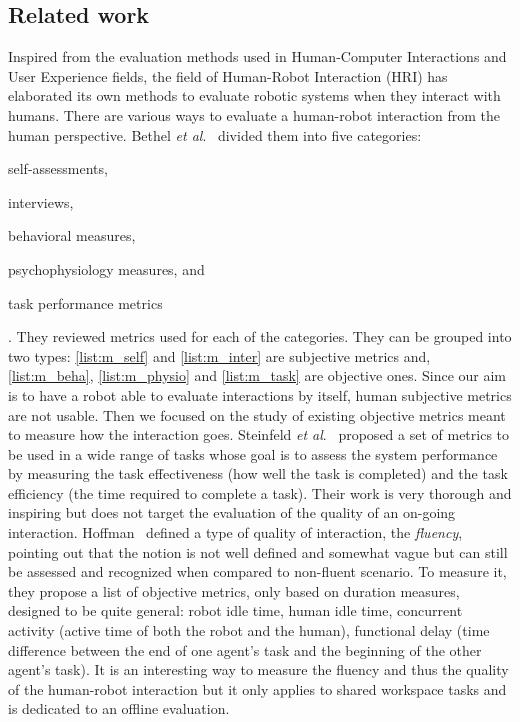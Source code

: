 \documentclass[a4paper,11pt,twoside]{StyleThese}
\begin{document}
\subsection{Related work}\label{sec:rel}

Inspired from the evaluation methods used in Human-Computer Interactions and User Experience fields, the field of Human-Robot Interaction (HRI) has elaborated its own methods to evaluate robotic systems when they interact with humans. There are various ways to evaluate a human-robot interaction from the human perspective. Bethel \textit{et al}.~\cite{bethel_2010_review} divided them into five categories: \begin{enumerate*}[label={(\arabic*)}]
	\item self-assessments,\label{list:m_self}
	\item interviews,\label{list:m_inter}
	\item behavioral measures,\label{list:m_beha}
	\item psychophysiology measures, and\label{list:m_physio}
	\item task performance metrics\label{list:m_task}
\end{enumerate*}. They reviewed metrics used for each of the categories. They can be grouped into two types: \ref{list:m_self} and \ref{list:m_inter} are subjective metrics and, \ref{list:m_beha}, \ref{list:m_physio} and \ref{list:m_task} are objective ones. Since our aim is to have a robot able to evaluate interactions by itself, human subjective metrics are not usable. Then we focused on the study of existing objective metrics meant to measure how the interaction goes. Steinfeld \textit{et al}.~\cite{steinfeld_2006_common} proposed a set of metrics to be used in a wide range of tasks whose goal is to assess the system performance by measuring the task effectiveness (\ie how well the task is completed) and the task efficiency (\ie the time required to complete a task). Their work is very thorough and inspiring but does not target the evaluation of the quality of an on-going interaction. 
Hoffman~\cite{hoffman2019} defined a type of quality of interaction, the \textit{fluency}, pointing out that the notion is not well defined and somewhat vague but can still be assessed and recognized when compared to non-fluent scenario. To measure it, they propose a list of objective metrics, only based on duration measures, designed to be quite general: robot idle time, human idle time, concurrent activity (\ie active time of both the robot and the human), functional delay (\ie time difference between the end of one agent’s task and the beginning of the other agent’s task). It is an interesting way to measure the fluency and thus the quality of the human-robot interaction but it only applies to shared workspace tasks and is dedicated to an offline evaluation.
\end{document}
